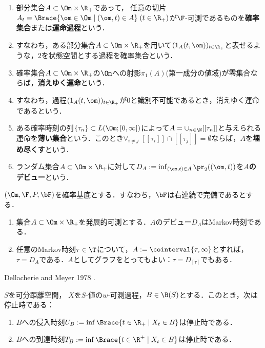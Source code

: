 \documentclass[uplatex,dvipdfmx]{jsreport}
\begin{document}
\begin{definition}\mbox{}
    \begin{enumerate}
        \item 部分集合$A\subset\Om\times\R_+$であって，
        任意の切片$A_t=\Brace{\om\in\Om\mid(\om,t)\in A}\;(t\in\R_+)$が$\F$-可測であるものを\textbf{確率集合}または\textbf{運命過程}という．
        \item すなわち，ある部分集合$A\subset\Om\times\R_+$を用いて$(1_A(t,\om))_{t\in\R_+}$と表せるような，$2$を状態空間とする過程を確率集合という．
        \item 確率集合$A\subset\Om\times\R_+$の$\Om$への射影$\pi_1(A)$(第一成分の値域)が零集合ならば，\textbf{消えゆく運命}という．
        \item すなわち，過程$(1_A(t,\om))_{t\in\R_+}$が$0$と識別不可能であるとき，消えゆく運命であるという．
        \item ある確率時刻の列$\{\tau_n\}\subset L(\Om;[0,\infty])$によって$A=\cup_{n\in\N}[[\tau_n]]$と与えられる運命を\textbf{薄い集合}という．このとき$\forall_{i\ne j}\;[[\tau_i]]\cap[[\tau_j]]=\emptyset$ならば，$A$を\textbf{埋め尽くす}という．
        \item ランダム集合$A\subset\Om\times\R_+$に対して$D_A:=\inf_{(\om,t)\in A}\pr_2((\om,t))$を\textbf{$A$のデビュー}という．
    \end{enumerate}
\end{definition}

\begin{theorem}[デビューによるMarkov時刻の特徴付け]
    $(\Om,\F,P,\bF)$を確率基底とする．すなわち，$\bF$は右連続で完備であるとする．
    \begin{enumerate}
        \item 集合$A\subset\Om\times\R_+$を発展的可測とする．$A$のデビュー$D_A$はMarkov時刻である．
        \item 任意のMarkov時刻$\tau\in\T$について，$A:=\cointerval{\tau,\infty}$とすれば，$\tau=D_A$である．$A$としてグラフをとってもよい：$\tau=D_{[\tau]}$でもある．
    \end{enumerate}
\end{theorem}
\begin{Proof}
    Dellacherie and Meyer 1978 \cite{Dellacherie-Meyer}.
\end{Proof}

\begin{corollary}
    $S$を可分距離空間，
    $X$を$S$-値の$w$-可測過程，$B\in\B(S)$とする．このとき，次は停止時である：
    \begin{enumerate}
        \item $B$への侵入時刻$U_B:=\inf\Brace{t\in\R_+\mid X_t\in B}$は停止時である．
        \item $B$への到達時刻$T_B:=\inf\Brace{t\in\R^+\mid X_t\in B}$は停止時である．
    \end{enumerate}
\end{corollary}
\end{document}
